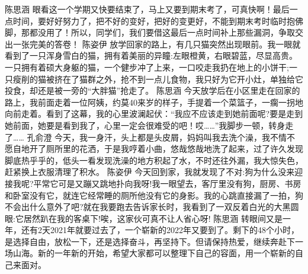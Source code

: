 {}\markdownRendererInterblockSeparator
{}陈思涵\markdownRendererInterblockSeparator
{}眼看这一个学期又快要结束了，马上又要到期末考了，可真快啊！最后一点时间，要好好努力了，把不好的变好，把好的变更好，不能到期末考时临时抱佛脚，那都没用了！所以，同学们，我们要借这最后一点时间补上那些漏洞，争取交出一张完美的答卷！\markdownRendererInterblockSeparator
{}\markdownRendererInterblockSeparator
{}陈姿伊\markdownRendererInterblockSeparator
{}放学回家的路上，有几只猫突然出现眼前。我一眼就看到了一只浑身雪白的猫，拥有着美丽的异瞳:左眼橙黄，右眼碧蓝，尽显高贵。一只拥有着硕大身躯的猫，一个健步冲了上来，一口咬走我扔在地上的小饼干;一只瘦削的猫被挤在了猫群之外，抢不到一点儿食物，我只好为它开小灶，单独给它投食，却还是被一旁的“大胖猫”抢走了。 \markdownRendererInterblockSeparator
{}\markdownRendererInterblockSeparator
{}陈思涵\markdownRendererInterblockSeparator
{}今天放学后在小区里走在回家的路上，我前面走着一位阿姨，约莫40来岁的样子，手提着一个菜篮子，一瘸一拐地向前走着。看到了这幕，我的心里波澜起伏：“我应不应该走到她前面呢?要是走到她前面，她要是看到我了，心里一定会很难受的吧！哎……”我脚步一顿，转身走了……\markdownRendererInterblockSeparator
{}\markdownRendererInterblockSeparator
{}孔俞澄\markdownRendererInterblockSeparator
{}今天，我一身汗，头上都是头皮屑，妈妈叫我去洗个澡，我不情不愿自地开了厕所里的花洒，于是我哼着小曲，悠哉悠哉地洗了起来，过了许久发现脚底热乎乎的，低头一看发现洗澡的地方积起了水，不时还往外漏，我大惊失色，赶紧换上衣服清理了积水。\markdownRendererInterblockSeparator
{}\markdownRendererInterblockSeparator
{}陈姿伊\markdownRendererInterblockSeparator
{}今天回到家，我就发现了不对:狗为什么没来迎接我呢?平常它可是又蹦又跳地扑向我呀!我一眼望去，客厅里没有狗，厨房、书房和卧室没有它，就连它经常睡的厕所他没有它的身影。我的心跳直接漏了一拍，狗不会出什么意外了吧?就在我要跑去告诉家长时，我看到了一双反着白光的大黑圆眼:它居然趴在我的客桌下!唉，这家伙可真不让人省心呀!\markdownRendererInterblockSeparator
{}\markdownRendererInterblockSeparator
{}陈思涵\markdownRendererInterblockSeparator
{}转眼间又是一年，还有2天2021年就要过去了，一个崭新的2022年又要到了。剩下的48个小时，是选择自由，放松一下，还是选择奋斗，再坚持下。但请保持热爱，继续奔赴下一场山海。新的一年新的开始，希望大家都可以整理下自己的容面，用一个崭新的自己来面对。\markdownRendererInterblockSeparator
{}\markdownRendererInterblockSeparator
